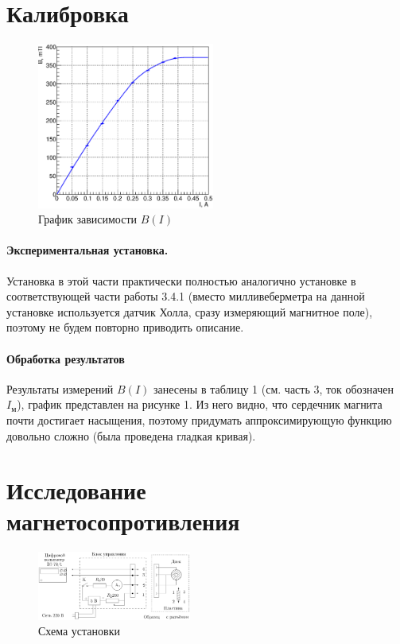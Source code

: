\documentclass[12pt,a4paper]{article}
\begin{document}
\section{Калибровка}
\begin{figure}
\vspace{-40pt}
\centering\includegraphics[width = 0.52\textwidth]{Plot1}
\captionsetup{justification = centering}
\caption{График зависимости $B(I)$\label{Fig1}}
\vspace{-15pt}
\end{figure}
\paragraph{Экспериментальная установка.} Установка в этой части практически полностью аналогично установке в соответствующей части работы 3.4.1 (вместо милливеберметра на данной установке используется датчик Холла, сразу измеряющий магнитное поле), поэтому не будем повторно приводить описание.
\paragraph{Обработка результатов} Результаты измерений $B(I)$ занесены в таблицу 1 (см. часть 3, ток обозначен $I_\text{м}$), график представлен на рисунке 1. Из него видно, что сердечник магнита почти достигает насыщения, поэтому придумать аппроксимирующую функцию довольно сложно (была проведена гладкая кривая).
\section{Исследование \\ магнетосопротивления}
\begin{figure}
\centering\includegraphics[width = 0.45\textwidth]{Pct1}
\captionsetup{justification = centering}
\caption{Схема установки \label{Fig2}}
\end{figure}
\end{document}
